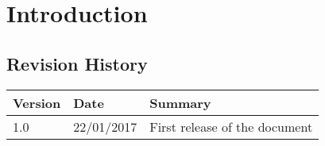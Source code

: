 \documentclass[11pt,a4paper]{report}
\begin{document}


\thispagestyle{empty}
\tableofcontents
\listoffigures
\cleardoublepage
{}
\pagestyle{fancy}

\chapter{Introduction}
\section{Revision History}
\begin{tabularx}{\textwidth}{|l|l|X|}
\hline
Version & Date & Summary\\
\hline
1.0 & 22/01/2017 & First release of the document\\
\hline
\end{tabularx}
\end{document}

